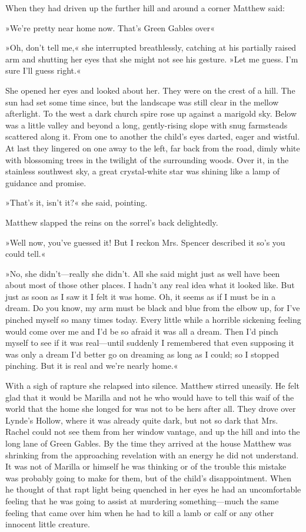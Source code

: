When they had driven up the further hill and around a corner Matthew said:

»We’re pretty near home now. That’s Green Gables over\longdash«

»Oh, don’t tell me,« she interrupted breathlessly, catching at his partially raised arm and shutting her eyes that she might not see his gesture. »Let me guess. I’m sure I’ll guess right.«

She opened her eyes and looked about her. They were on the crest of a hill. The sun had set some time since, but the landscape was still clear in the mellow afterlight. To the west a dark church spire rose up against a marigold sky. Below was a little valley and beyond a long, gently-rising slope with snug farmsteads scattered along it. From one to another the child’s eyes darted, eager and wistful. At last they lingered on one away to the left, far back from the road, dimly white with blossoming trees in the twilight of the surrounding woods. Over it, in the stainless southwest sky, a great crystal-white star was shining like a lamp of guidance and promise.

»That’s it, isn’t it?« she said, pointing.

Matthew slapped the reins on the sorrel’s back delightedly.

»Well now, you’ve guessed it! But I reckon Mrs. Spencer described it so’s you could tell.«

»No, she didn’t—really she didn’t. All she said might just as well have been about most of those other places. I hadn’t any real idea what it looked like. But just as soon as I saw it I felt it was home. Oh, it seems as if I must be in a dream. Do you know, my arm must be black and blue from the elbow up, for I’ve pinched myself so many times today. Every little while a horrible sickening feeling would come over me and I’d be so afraid it was all a dream. Then I’d pinch myself to see if it was real—until suddenly I remembered that even supposing it was only a dream I’d better go on dreaming as long as I could; so I stopped pinching. But it is real and we’re nearly home.«

With a sigh of rapture she relapsed into silence. Matthew stirred uneasily. He felt glad that it would be Marilla and not he who would have to tell this waif of the world that the home she longed for was not to be hers after all. They drove over Lynde’s Hollow, where it was already quite dark, but not so dark that Mrs. Rachel could not see them from her window vantage, and up the hill and into the long lane of Green Gables. By the time they arrived at the house Matthew was shrinking from the approaching revelation with an energy he did not understand. It was not of Marilla or himself he was thinking or of the trouble this mistake was probably going to make for them, but of the child’s disappointment. When he thought of that rapt light being quenched in her eyes he had an uncomfortable feeling that he was going to assist at murdering something—much the same feeling that came over him when he had to kill a lamb or calf or any other innocent little creature.

